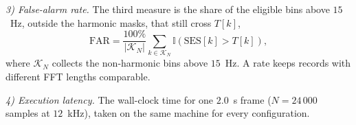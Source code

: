 \emph{3) False-alarm rate.} The third measure is the share of the eligible
bins above $15$~Hz, outside the harmonic masks, that still cross $T[k]$,
\begin{equation}
  \text{FAR} = \frac{100\%}{\left|\mathcal{K}_{N}\right|}
  \sum_{k\in\mathcal{K}_{N}}\mathbb{I}\!\left(\text{SES}[k]>T[k]\right),
  \label{eq:far}
\end{equation}
where $\mathcal{K}_{N}$ collects the non-harmonic bins above $15$~Hz. A rate
keeps records with different FFT lengths comparable.

\emph{4) Execution latency.} The wall-clock time for one $2.0$~s frame
($N=24\,000$ samples at $12$~kHz), taken on the same machine for every
configuration.
